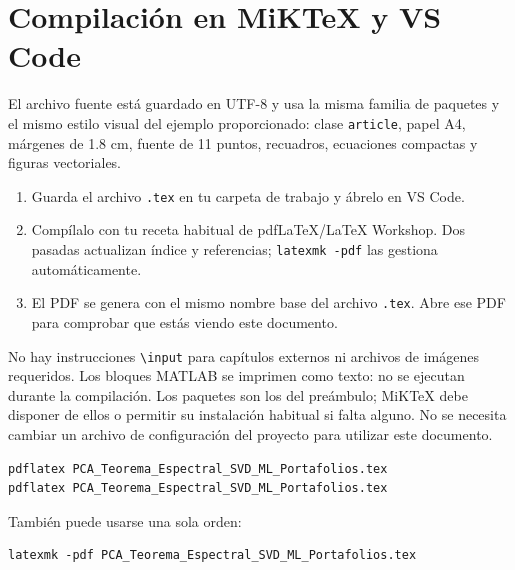 \documentclass[11pt,a4paper]{article}
\theoremstyle{definition}
\begin{document}
\section{Compilación en MiKTeX y VS Code}
El archivo fuente está guardado en UTF-8 y usa la misma familia de paquetes y el mismo estilo visual del ejemplo proporcionado: clase \texttt{article}, papel A4, márgenes de 1.8 cm, fuente de 11 puntos, recuadros, ecuaciones compactas y figuras vectoriales.
\begin{enumerate}
\item Guarda el archivo \texttt{.tex} en tu carpeta de trabajo y ábrelo en VS Code.
\item Compílalo con tu receta habitual de pdfLaTeX/LaTeX Workshop. Dos pasadas actualizan índice y referencias; \texttt{latexmk -pdf} las gestiona automáticamente.
\item El PDF se genera con el mismo nombre base del archivo \texttt{.tex}. Abre ese PDF para comprobar que estás viendo este documento.
\end{enumerate}
No hay instrucciones \texttt{\textbackslash input} para capítulos externos ni archivos de imágenes requeridos. Los bloques MATLAB se imprimen como texto: no se ejecutan durante la compilación. Los paquetes son los del preámbulo; MiKTeX debe disponer de ellos o permitir su instalación habitual si falta alguno. No se necesita cambiar un archivo de configuración del proyecto para utilizar este documento.
\begin{lstlisting}
pdflatex PCA_Teorema_Espectral_SVD_ML_Portafolios.tex
pdflatex PCA_Teorema_Espectral_SVD_ML_Portafolios.tex
\end{lstlisting}
También puede usarse una sola orden:
\begin{lstlisting}
latexmk -pdf PCA_Teorema_Espectral_SVD_ML_Portafolios.tex
\end{lstlisting}
\end{document}
